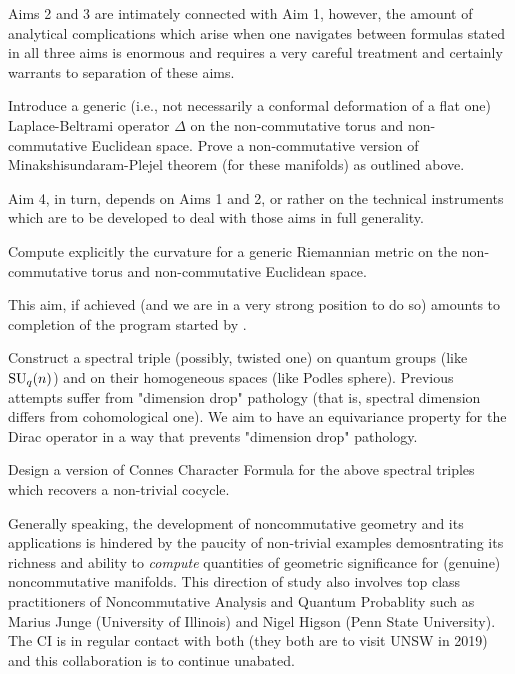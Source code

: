 \documentclass{article}
\newcommand{\archeading}[1]{\vspace{.3cm} \noindent{\bfseries #1} \vspace{.1cm}   }
\begin{document}
Aims 2 and 3 are intimately connected with Aim 1, however, the amount of analytical complications which arise when one navigates between formulas stated in all three aims is enormous and requires a very careful treatment and certainly warrants to separation of these aims.

 Introduce a generic (i.e., not necessarily a conformal deformation of a flat one) Laplace-Beltrami operator $\Delta$ on the non-commutative torus and non-commutative Euclidean space. Prove a non-commutative version of Minakshisundaram-Plejel theorem (for these manifolds) as outlined above.

Aim 4, in turn, depends on Aims 1 and 2, or rather on the technical instruments which are to be developed to deal with those aims in full generality.

 Compute explicitly the curvature for a generic Riemannian metric on the non-commutative torus and non-commutative Euclidean space.

This aim, if achieved (and we are in a very strong position to do so) amounts to completion of the program started by \cite{ChakrabortyPal,Connes-suq2,NeshTus}.

 Construct a spectral triple (possibly, twisted one) on quantum groups (like ${\rm SU}_q(n)$) and on their homogeneous spaces (like Podles sphere). Previous attempts \cite{ChakrabortyPal} suffer from "dimension drop" pathology (that is, spectral dimension differs from cohomological one). We aim to have an equivariance property for the Dirac operator in a way that prevents "dimension drop" pathology. 

 Design a version of Connes Character Formula for the above spectral triples which recovers a non-trivial cocycle.

Generally speaking, the development of noncommutative geometry and its applications is hindered by the paucity of non-trivial examples demosntrating its richness and ability to {\it compute} quantities of geometric significance for (genuine) noncommutative manifolds. This direction of study also involves top class practitioners of Noncommutative Analysis and Quantum Probablity such as Marius Junge (University of Illinois) and Nigel Higson (Penn State University). The CI is in regular contact with both (they both are to visit UNSW in 2019) and this collaboration is to continue unabated.

\bigskip\archeading{Future Fellowship Candidate}
\end{document}
